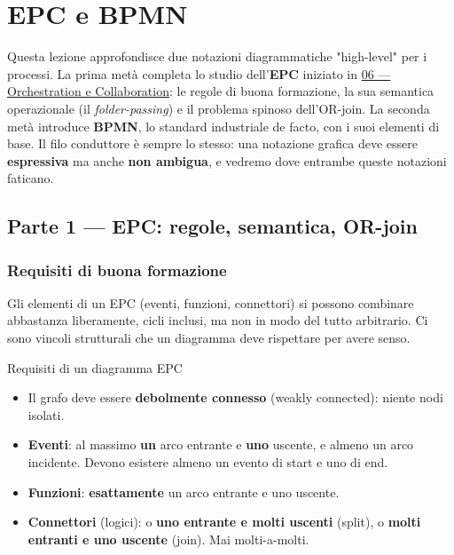 \chapter{\texorpdfstring{EPC e BPMN}{EPC e BPMN}}
\label{ch:07a}

Questa lezione approfondisce due notazioni diagrammatiche "high-level" per i processi. La prima metà completa lo studio dell'\textbf{EPC} iniziato in \hyperref[ch:06]{06 — Orchestration e Collaboration}: le regole di buona formazione, la sua semantica operazionale (il \emph{folder-passing}) e il problema spinoso dell'OR-join. La seconda metà introduce \textbf{BPMN}, lo standard industriale de facto, con i suoi elementi di base. Il filo conduttore è sempre lo stesso: una notazione grafica deve essere \textbf{espressiva} ma anche \textbf{non ambigua}, e vedremo dove entrambe queste notazioni faticano.

\section{\texorpdfstring{Parte 1 — EPC: regole, semantica, OR-join}{Parte 1 — EPC: regole, semantica, OR-join}}

\subsection{\texorpdfstring{Requisiti di buona formazione}{Requisiti di buona formazione}}

Gli elementi di un EPC (eventi, funzioni, connettori) si possono combinare abbastanza liberamente, cicli inclusi, ma non in modo del tutto arbitrario. Ci sono vincoli strutturali che un diagramma deve rispettare per avere senso.

\begin{boxdefinition}{Requisiti di un diagramma EPC}
\begin{itemize}
\item Il grafo deve essere \textbf{debolmente connesso} (weakly connected): niente nodi isolati.
\item \textbf{Eventi}: al massimo \textbf{un} arco entrante e \textbf{uno} uscente, e almeno un arco incidente. Devono esistere almeno un evento di start e uno di end.
\item \textbf{Funzioni}: \textbf{esattamente} un arco entrante e uno uscente.
\item \textbf{Connettori} (logici): o \textbf{uno entrante e molti uscenti} (split), o \textbf{molti entranti e uno uscente} (join). Mai molti-a-molti.
\end{itemize}
\end{boxdefinition}

